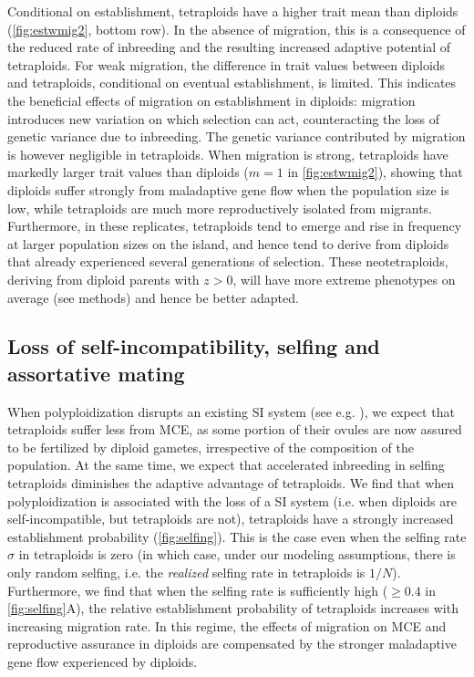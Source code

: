 \documentclass[12pt,a4paper]{article}
\begin{document}
Conditional on establishment, tetraploids have a higher trait mean than
diploids (\cref{fig:estwmig2}, bottom row).
In the absence of migration, this is a consequence of the reduced rate of
inbreeding and the resulting increased adaptive potential of tetraploids.
For weak migration, the difference in trait values between diploids and
tetraploids, conditional on eventual establishment, is limited.
This indicates the beneficial effects of migration on establishment in
diploids: migration introduces new variation on which selection can act,
counteracting the loss of genetic variance due to inbreeding.
The genetic variance contributed by migration is however negligible in
tetraploids.
When migration is strong, tetraploids have markedly larger trait values
than diploids ($m=1$ in \cref{fig:estwmig2}), showing that diploids suffer
strongly from maladaptive gene flow when the population size is low, while
tetraploids are much more reproductively isolated from migrants.
Furthermore, in these replicates, tetraploids tend to emerge and rise in
frequency at larger population sizes on the island, and hence tend to derive
from diploids that already experienced several generations of selection.
These neotetraploids, deriving from diploid parents with $z>0$, will have more
extreme phenotypes on average (see methods) and hence be better adapted.


\subsection*{Loss of self-incompatibility, selfing and assortative mating}

When polyploidization disrupts an existing SI system (see e.g.
\cite{robertson2011comparative,zenil2019,novikova2023}), we expect that
tetraploids suffer less from MCE, as some portion of their ovules are now
assured to be fertilized by diploid gametes, irrespective of the composition of
the population.
At the same time, we expect that accelerated inbreeding in selfing tetraploids
diminishes the adaptive advantage of tetraploids.
We find that when polyploidization is associated with the loss of a SI system
(i.e. when diploids are self-incompatible, but tetraploids are not),
tetraploids have a strongly increased establishment probability
(\cref{fig:selfing}).
This is the case even when the selfing rate $\sigma$ in tetraploids is zero (in
which case, under our modeling assumptions, there is only random selfing, i.e.
the \textit{realized} selfing rate in tetraploids is $1/N$).
Furthermore, we find that when the selfing rate is sufficiently high ($\ge 0.4$
in \cref{fig:selfing}A), the relative establishment probability of tetraploids
increases with increasing migration rate.
In this regime, the effects of migration on MCE and reproductive assurance in
diploids are compensated by the stronger maladaptive gene flow experienced by
diploids.
\end{document}
